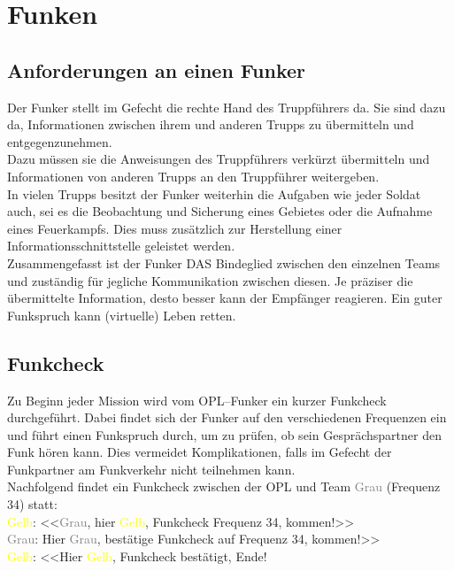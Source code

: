 \newpage

\section{Funken}

\label{Funken}

\subsection{Anforderungen an einen Funker}
	Der Funker stellt im Gefecht die rechte Hand des Truppführers da. Sie sind dazu da, Informationen zwischen ihrem und anderen Trupps zu übermitteln und entgegenzunehmen. \\
	Dazu müssen sie die Anweisungen des Truppführers verkürzt übermitteln und Informationen von anderen Trupps an den Truppführer weitergeben. \\
	In vielen Trupps besitzt der Funker weiterhin die Aufgaben wie jeder Soldat auch, sei es die Beobachtung und Sicherung eines Gebietes oder die Aufnahme eines Feuerkampfs. Dies muss zusätzlich zur Herstellung einer Informationsschnittstelle geleistet werden. \\
	Zusammengefasst ist der Funker DAS Bindeglied zwischen den einzelnen Teams und zuständig für jegliche Kommunikation zwischen diesen. Je präziser die übermittelte Information, desto besser kann der Empfänger reagieren. Ein guter Funkspruch kann (virtuelle) Leben retten. \\

\subsection{Funkcheck}
	Zu Beginn jeder Mission wird vom \ac{OPL}–Funker ein kurzer Funkcheck durchgeführt. Dabei findet sich der Funker auf den verschiedenen Frequenzen ein und führt einen  Funkspruch durch, um zu prüfen, ob sein Gesprächspartner den Funk hören kann. Dies vermeidet Komplikationen, falls im Gefecht der Funkpartner am Funkverkehr nicht teilnehmen kann. \\
	Nachfolgend findet ein Funkcheck zwischen der \ac{OPL} und Team \textcolor{gray}{Grau} (Frequenz 34) statt: \\
	\textcolor{yellow}{Gelb}: <<\textcolor{gray}{Grau}, hier \textcolor{yellow}{Gelb}, Funkcheck Frequenz 34, kommen!>> \\
	\textcolor{gray}{Grau}: Hier \textcolor{gray}{Grau}, bestätige Funkcheck auf Frequenz 34, kommen!>> \\
	\textcolor{yellow}{Gelb}: <<Hier \textcolor{yellow}{Gelb}, Funkcheck bestätigt, Ende! \\

